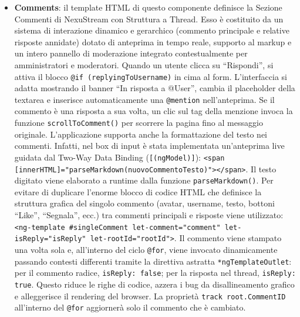 \documentclass[11pt,a4paper]{article}
\begin{document}
\begin{itemize}
    \item \textbf{Comments}: il template HTML di questo componente definisce la Sezione Commenti di NexuStream con Struttura a Thread. Esso è costituito da un sistema di interazione dinamico e gerarchico (commento principale e relative risposte annidate) dotato di anteprima in tempo reale, supporto al markup e un intero pannello di moderazione integrato contestualmente per amministratori e moderatori. Quando un utente clicca su ``Rispondi'', si attiva il blocco \texttt{@if (replyingToUsername)} in cima al form. L'interfaccia si adatta mostrando il banner ``In risposta a @User'', cambia il placeholder della textarea e inserisce automaticamente una \texttt{@mention} nell'anteprima. Se il commento è una risposta a sua volta, un clic sul tag della menzione invoca la funzione \texttt{scrollToComment()} per scorrere la pagina fino al messaggio originale. L'applicazione supporta anche la formattazione del testo nei commenti. Infatti, nel box di input è stata implementata un'anteprima live guidata dal Two-Way Data Binding (\texttt{[(ngModel)]}): \texttt{<span [innerHTML]="parseMarkdown(nuovoCommentoTesto)"></span>}. Il testo digitato viene elaborato a runtime dalla funzione \texttt{parseMarkdown()}. Per evitare di duplicare l'enorme blocco di codice HTML che definisce la struttura grafica del singolo commento (avatar, username, testo, bottoni ``Like'', ``Segnala'', ecc.) tra commenti principali e risposte viene utilizzato: \texttt{<ng-template \#singleComment let-comment="comment" let-isReply="isReply" let-rootId="rootId">}. Il commento viene stampato una volta sola e, all'interno del ciclo \texttt{@for}, viene invocato dinamicamente passando contesti differenti tramite la direttiva astratta \texttt{*ngTemplateOutlet}: per il commento radice, \texttt{isReply: false}; per la risposta nel thread, \texttt{isReply: true}. Questo riduce le righe di codice, azzera i bug da disallineamento grafico e alleggerisce il rendering del browser. La proprietà \texttt{track root.CommentID} all’interno del \texttt{@for} aggiornerà solo il commento che è cambiato. 
    

\end{itemize}
\end{document}
